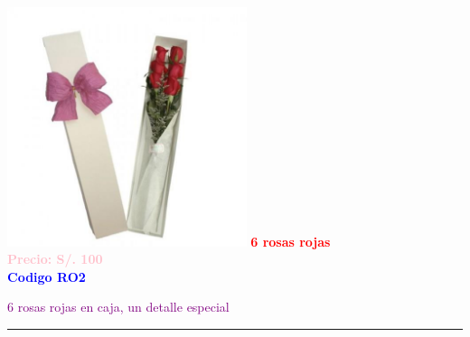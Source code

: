\begin{multicols}{2}
    \begin{minipage}{\linewidth}
        \centering
        \includegraphics[height=7cm]{imagenes_extraidas/image_5_4} %
        \newline
        \vspace{0.1cm}
        \textbf{\Large \textcolor{red}{6 rosas rojas}} \\ %
        \vspace{0.2cm}
        \textbf{\textcolor{pink}{Precio: S/. 100}} \\ %
        \vspace{0.2cm}
        \textbf{\textcolor{blue}{Codigo RO2}} \\ %
        \vspace{0.2cm}
        \begin{minipage}{0.8\linewidth} 
            \small \textcolor{purple}{6 rosas rojas en caja, un detalle especial} %
        \end{minipage}
        \vspace{0.1cm}        
        \rule{\linewidth}{0.5pt}
    \end{minipage}
    

\end{multicols}
